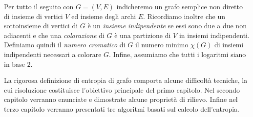 Per tutto il seguito con $G=(V,E)$ indicheremo un grafo semplice non diretto di insieme di vertici $V$ ed insieme degli archi $E$. Ricordiamo inoltre che un sottoinsieme di vertici di $G$ è un \emph{insieme indipendente} se essi sono due a due non adiacenti e che una \emph{colorazione} di $G$ è una partizione di $V$ in insiemi indipendenti. Definiamo quindi il \emph{numero cromatico} di $G$ il numero minimo $\chi(G)$ di insiemi indipendenti necessari a colorare $G$. Infine, assumiamo che tutti i logaritmi siano in base $2$.

La rigorosa definizione di entropia di grafo comporta alcune difficoltà tecniche, la cui risoluzione costituisce l'obiettivo principale del primo capitolo. Nel secondo capitolo verranno enunciate e dimostrate alcune proprietà di rilievo. Infine nel terzo capitolo verranno presentati tre algoritmi basati sul calcolo dell'entropia. 
